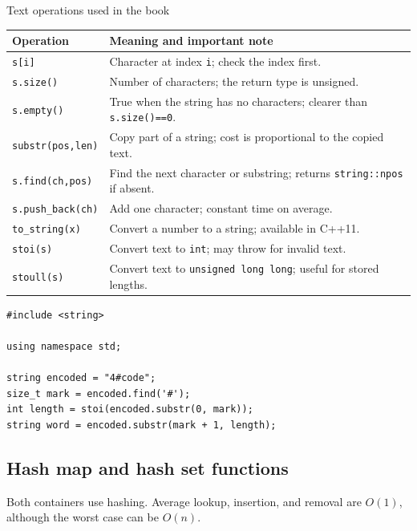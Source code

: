 \begin{revisionbox}{Text operations used in the book}
\small
\setlength{\tabcolsep}{3pt}
\begin{tabularx}{\linewidth}{@{}>{\raggedright\arraybackslash}p{3.6cm}X@{}}
\toprule
Operation & Meaning and important note \\
\midrule
\texttt{s[i]} & Character at index \texttt{i}; check the index first. \\
\texttt{s.size()} & Number of characters; the return type is unsigned. \\
\texttt{s.empty()} & True when the string has no characters; clearer than \texttt{s.size()==0}. \\
\texttt{substr(pos,len)} & Copy part of a string; cost is proportional to the copied text. \\
\texttt{s.find(ch,pos)} & Find the next character or substring; returns \texttt{string::npos} if absent. \\
\texttt{s.push\_back(ch)} & Add one character; constant time on average. \\
\texttt{to\_string(x)} & Convert a number to a string; available in C++11. \\
\texttt{stoi(s)} & Convert text to \texttt{int}; may throw for invalid text. \\
\texttt{stoull(s)} & Convert text to \texttt{unsigned long long}; useful for stored lengths. \\
\bottomrule
\end{tabularx}
\end{revisionbox}

\begin{lstlisting}
#include <string>

using namespace std;

string encoded = "4#code";
size_t mark = encoded.find('#');
int length = stoi(encoded.substr(0, mark));
string word = encoded.substr(mark + 1, length);
\end{lstlisting}

\subsection{Hash map and hash set functions}

Both containers use hashing. Average lookup, insertion, and removal are
$O(1)$, although the worst case can be $O(n)$.

